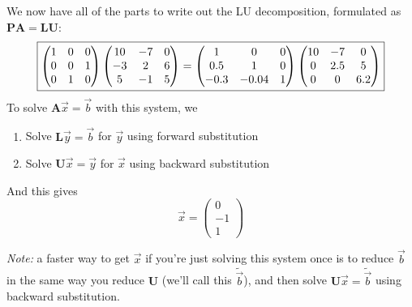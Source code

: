 \documentclass[12pts, answers]{exam}
\newcommand{\ve}[1]{\ensuremath{\mathbf{#1}}}
\begin{document}
\begin{questions}
\begin{solution}
We now have all of the parts to write out the LU decomposition, formulated as $\ve{P}\ve{A} = \ve{L}\ve{U}$:
\begin{equation}
\boxed{\begin{pmatrix}
1 & 0 & 0 \\
0 & 0 & 1 \\
0 & 1 & 0
\end{pmatrix} %
\begin{pmatrix}
   \baa & \bab & \bac \\
   \bba & \bbb & \bbc \\
   \bca & \bcb & \bcc \\
\end{pmatrix} = %
%
\begin{pmatrix}
1 & 0 & 0 \\
0.5 & 1 & 0 \\
-0.3 & -0.04 & 1 \\
\end{pmatrix} %
\begin{pmatrix}
   \baa & \bab & \bac \\
   0    & 2.5  & \bcc \\
   0    & 0    & 6.2 \\
\end{pmatrix} \nonumber} %
\end{equation}
%
To solve $\ve{A}\vec{x} = \vec{b}$ with this system, we 
%
\begin{enumerate}
\item Solve $\ve{L}\vec{y} = \vec{b}$ for $\vec{y}$ using forward substitution
\item Solve $\ve{U}\vec{x} = \vec{y}$ for $\vec{x}$ using backward substitution
\end{enumerate}
%
And this gives
\begin{equation}
\boxed{\vec{x}= \begin{pmatrix} 0 \\ -1 \\ 1 \end{pmatrix}} \nonumber
\end{equation}

\textit{Note:} a faster way to get $\vec{x}$ if you're just solving this system once is to reduce $\vec{b}$ in the same way you reduce \ve{U} (we'll call this $\tilde{\vec{b}}$), and then solve $\ve{U}\vec{x} = \tilde{\vec{b}}$ using backward substitution.

\end{solution}

\end{questions}
\end{document}
